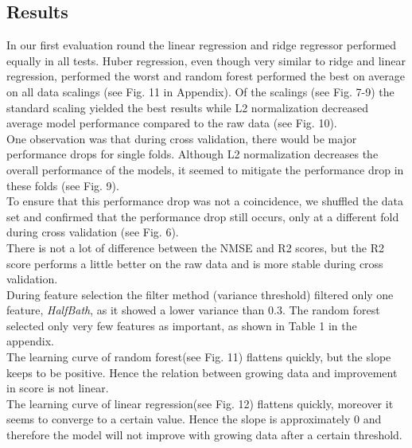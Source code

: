\documentclass[a4paper,12pt]{article}
\newcommand{\initials}[1]{\marginpar{\quad\texttt{#1}}}
\begin{document}
\subsection{Results}
\initials{LB & MF}
In our first evaluation round the linear regression and ridge regressor performed equally in all tests. Huber regression, even though very similar to ridge and linear regression, performed the worst and random forest performed the best on average on all data scalings (see Fig. 11 in Appendix).
Of the scalings (see Fig. 7-9) the standard scaling yielded the best results while L2 normalization decreased average model performance compared to the raw data (see Fig. 10).\\
One observation was that during cross validation, there would be major performance drops for single folds. Although L2 normalization decreases the overall performance of the models, it seemed to mitigate the performance drop in these folds (see Fig. 9).\\
To ensure that this performance drop was not a coincidence, we shuffled the data set and confirmed that the performance drop still occurs, only at a different fold during cross validation (see Fig. 6).\\
There is not a lot of difference between the NMSE and R2 scores, but the R2 score performs a little better on the raw data and is more stable during cross validation.\\
During feature selection the filter method (variance threshold) filtered only one feature, \textit{HalfBath}, as it showed a lower variance than 0.3. The random forest selected only very few features as important, as shown in Table 1 in the appendix.\\
The learning curve of random forest(see Fig. 11) flattens quickly, but the slope keeps to be positive. Hence the relation between growing data and improvement in score is not linear.\\
The learning curve of linear regression(see Fig. 12) flattens quickly, moreover it seems to converge to a certain value. Hence the slope is approximately 0 and therefore the model will not improve with growing data after a certain threshold.
\end{document}
